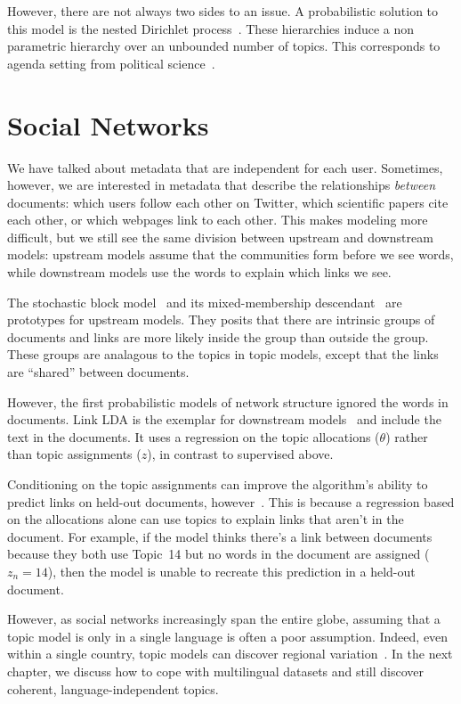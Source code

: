 
However, there are not always two sides to an issue.  A probabilistic
solution to this model is the nested Dirichlet
process~\citep{blei-07}.  These hierarchies induce a non parametric
hierarchy over an unbounded number of topics.  This corresponds to
agenda setting from political
science~\citep{Nguyen:Boyd-Graber:Resnik:Miler-2015}.


\section{Social Networks}

We have talked about metadata that are independent for each user.
Sometimes, however, we are interested in metadata that describe the
relationships \emph{between} documents: which users follow each other
on Twitter, which scientific papers cite each other, or which webpages
link to each other.  This makes modeling more difficult, but we still
see the same division between upstream and downstream models: upstream
models assume that the communities form before we see words, while
downstream models use the words to explain which links we see.

The stochastic block model~\citep{holland-83} and its mixed-membership
descendant~\citep{airoldi-08} are prototypes for upstream models.
They posits that there are intrinsic groups of documents and links are
more likely inside the group than outside the group.  These groups are
analagous to the topics in topic models, except that the links are
``shared'' between documents.

However, the first probabilistic models of network structure ignored
the words in documents.  Link LDA is the exemplar for downstream
models~\cite{nallapati-08} and include the text in the documents.  It
uses a regression on the topic allocations ($\theta$) rather than
topic assignments ($z$), in contrast to supervised  above.

Conditioning on the topic assignments can improve the algorithm's
ability to predict links on held-out documents,
however~\citep{chang-09a}.  This is because a regression based on the
allocations alone can use topics to explain links that aren't in the
document.  For example, if the model thinks there's a link between
documents because they both use Topic~14 but no words in the document
are assigned ($z_n=14$), then the model is unable to recreate this
prediction in a held-out document.


However, as social networks increasingly span the entire globe,
assuming that a topic model is only in a single language is often a
poor assumption.  Indeed, even within a single country, topic models
can discover regional variation~\citep{eisenstein-10}.  In the next
chapter, we discuss how to cope with multilingual datasets and still
discover coherent, language-independent topics.

